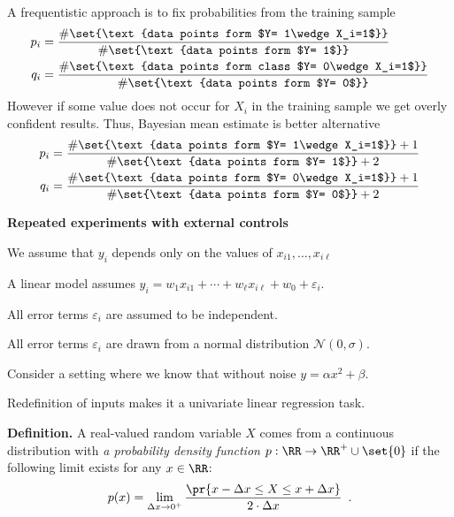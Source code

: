 \documentclass[landscape,footrule]{foils}
\begin{document}
A frequentistic approach is to fix probabilities from the training sample
\begin{align*}
p_i&=\frac{\#\set{\text{data points form $Y= 1\wedge X_i=1$}}}{\#\set{\text{data points form $Y= 1$}}}\\
q_i&=\frac{\#\set{\text{data points form class $Y= 0\wedge X_i=1$}}}{\#\set{\text{data points form $Y= 0$}}}
\end{align*}
However if some value does not occur for $X_i$ in the training sample we get overly confident results. Thus, Bayesian mean estimate is better alternative  
\begin{align*}
p_i&=\frac{\#\set{\text{data points form $Y= 1\wedge X_i=1$}}+1}{\#\set{\text{data points form $Y= 1$}}+2}\\
q_i&=\frac{\#\set{\text{data points form $Y= 0\wedge X_i=1$}}+1}{\#\set{\text{data points form $Y= 0$}}+2}
\end{align*}




\textbf{Repeated experiments with external controls}
\begin{triangles}
\item We assume that $y_i$ depends only on the values of $x_{i1}, \ldots, x_{i\ell}$ 
\item A linear model assumes $y_{i}=w_{1}x_{i1}+\cdots+ w_\ell x_{i\ell}+ w_{0}+\varepsilon_i$.
\item All error terms $\varepsilon_i$ are assumed to be independent.
\item  All error terms $\varepsilon_i$ are drawn from a normal distribution $\mathcal{N}(0,\sigma)$.
\end{triangles}



Consider a setting where we know that without noise $y=\alpha x^2+\beta$.
\begin{triangles}
\item Redefinition of inputs makes it a univariate linear regression task.
\end{triangles}




\textbf{Definition.}
A real-valued random variable $X$ comes from a continuous distribution with \emph{a probability density function} $p:\RR\to\RR^+\cup\set{0}$ if the following limit exists for any $x\in\RR$:
\begin{align*}
p(x)=\lim_{\Delta x \to 0^+} \frac{\pr{x -\Delta x \leq X\leq x+\Delta x}}{2\cdot \Delta x}\enspace.
\end{align*} 
\end{document}

